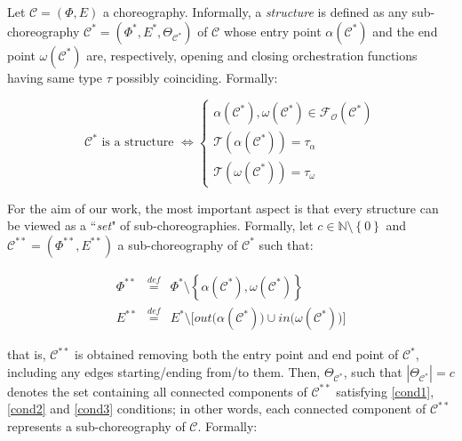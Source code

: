 \documentclass[12pt,a4paper]{report}
\newcommand{\mathDef}{\overset{\textit{def}}{=}}
\newcommand{\N}{\mathbb{N}}
\newcommand{\ItalicQuotMark}[1]{``\textit{#1}"}
\begin{document}
Let $\mathcal{C} = (\Phi,E)$ a choreography. Informally, a \textit{structure} is defined as any sub-choreography $\mathcal{C}^*= (\Phi^*,E^*,\Theta_{\mathcal{C}^*})$ of $\mathcal{C}$ whose entry point $\alpha(\mathcal{C}^*)$ and the end point $\omega(\mathcal{C}^*)$ are, respectively, opening and closing orchestration functions having same type $\tau$ possibly coinciding. Formally:

\begin{equation}
	\mathcal{C}^* \text{ is a structure } \Leftrightarrow \left\{ \begin{array}{l}
		\alpha(\mathcal{C}^*), \omega(\mathcal{C}^*) \in \mathscr{F_O}(\mathcal{C}^*) \\
		
		\mathscr{T}(\alpha(\mathcal{C}^*)) = \tau_{\alpha} \\ \mathscr{T}(\omega(\mathcal{C}^*)) = \tau_{\omega}
	\end{array} \right.
\end{equation}

For the aim of our work, the most important aspect is that every structure can be viewed as a \ItalicQuotMark{set} of sub-choreographies. Formally, let $c \in \N \setminus \left\{0\right\}$ and $\mathcal{C}^{**} = (\Phi^{**},E^{**})$ a sub-choreography of $\mathcal{C}^*$ such that:

\begin{equation}
	\begin{array}{lll}
		\Phi^{**} & \mathDef & \Phi^* \setminus \left\lbrace \alpha(\mathcal{C}^*),\omega(\mathcal{C}^*) \right\rbrace   \\
		E^{**} & \mathDef & E^* \setminus \Big[ out \Big( \alpha(\mathcal{C}^*) \Big) \cup in \Big( \omega(\mathcal{C}^*) \Big) \Big]
	\end{array}
\end{equation}

that is, $\mathcal{C}^{**}$ is obtained removing both the entry point and end point of $\mathcal{C}^{*}$, including any edges starting/ending from/to them. Then, $\Theta_{\mathcal{C}^*}$, such that $|\Theta_{\mathcal{C}^*}| = c$ denotes the set containing all connected components of $\mathcal{C}^{**}$ satisfying \ref{cond1}, \ref{cond2} and \ref{cond3} conditions; in other words, each connected component of $\mathcal{C}^{**}$ represents a sub-choreography of $\mathcal{C}$. Formally:
\end{document}
